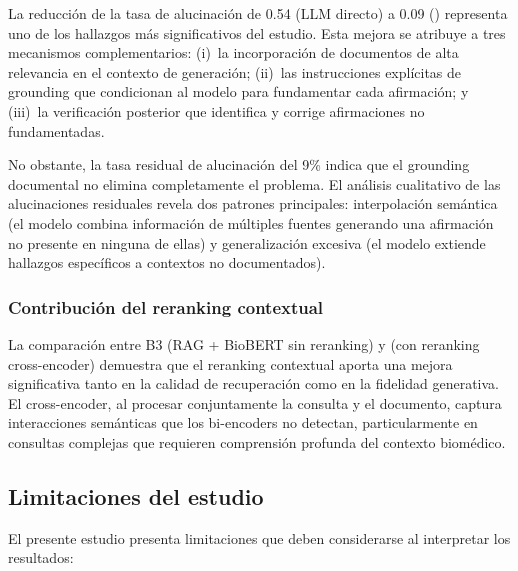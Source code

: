 La reducción de la tasa de alucinación de 0.54 (LLM directo) a 0.09 (\sirca{}) representa uno de los hallazgos más significativos del estudio. Esta mejora se atribuye a tres mecanismos complementarios: (i)~la incorporación de documentos de alta relevancia en el contexto de generación; (ii)~las instrucciones explícitas de grounding que condicionan al modelo para fundamentar cada afirmación; y (iii)~la verificación posterior que identifica y corrige afirmaciones no fundamentadas.

No obstante, la tasa residual de alucinación del 9\% indica que el grounding documental no elimina completamente el problema. El análisis cualitativo de las alucinaciones residuales revela dos patrones principales: interpolación semántica (el modelo combina información de múltiples fuentes generando una afirmación no presente en ninguna de ellas) y generalización excesiva (el modelo extiende hallazgos específicos a contextos no documentados).

\subsubsection{Contribución del reranking contextual}

La comparación entre B3 (RAG + BioBERT sin reranking) y \sirca{} (con reranking cross-encoder) demuestra que el reranking contextual aporta una mejora significativa tanto en la calidad de recuperación como en la fidelidad generativa. El cross-encoder, al procesar conjuntamente la consulta y el documento, captura interacciones semánticas que los bi-encoders no detectan, particularmente en consultas complejas que requieren comprensión profunda del contexto biomédico.

\subsection{Limitaciones del estudio}
\label{subsec:disc_limitations}

El presente estudio presenta limitaciones que deben considerarse al interpretar los resultados:

